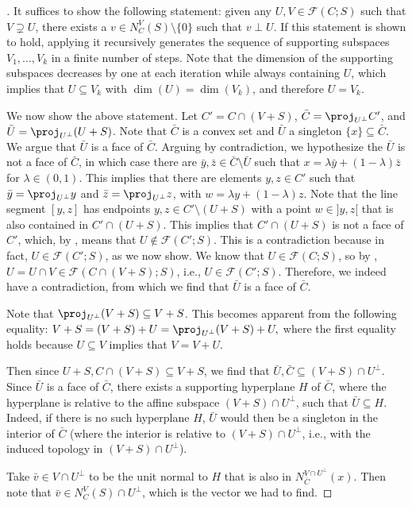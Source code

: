 \documentclass{article}
\theoremstyle{plain}
\theoremstyle{definition}
\theoremstyle{remark}
\begin{document}
\begin{proof}[\hypertarget{loc:completeness_of_the_composition_of_nested_normals.proof}Proof of \Cref{loc:completeness_of_the_composition_of_nested_normals.statement}]

It suffices to show the following statement: given any $U,V \in \mathcal{F}(C;S)$ such that $V \supsetneq U$,
there exists a $v \in N_C^V(S) \setminus \{0\}$ such that $v \perp U$. 
If this statement is shown to hold, applying it recursively generates the sequence of supporting subspaces $V_1, \ldots, V_k$ in a finite number of steps. 
Note that the dimension of the supporting subspaces decreases by one at each iteration while always containing $U$, which implies that $U \subseteq V_k$ with $\dim(U)=\dim(V_k)$, and therefore $U=V_k.$

We now show the above statement.
Let $C' = C \cap (V + S)$, $\bar{C} = \proj_{U^\perp} C'$, and $\bar{U} =  \proj_{U^\perp} (U + S)$.
Note that $\bar{C}$ is a convex set and $\bar{U}$
a singleton $\{x\} \subseteq \bar{C}$.  We argue that $\bar{U}$ is a face of $\bar{C}$.
Arguing by contradiction, we hypothesize the $\bar{U}$ is not a face of $\bar{C}$, in which case there are $\bar{y}, \bar{z} \in \bar{C}\setminus \bar{U}$
such that $x = \lambda\bar{y} + (1-\lambda)\bar{z}$ for $\lambda \in (0, 1)$. This implies that there are elements $y, z \in C'$ such that $\bar{y}= \proj_{U^\perp}y$ 
and $\bar{z}= \proj_{U^\perp}z$, with $w =  \lambda y+(1-\lambda)z$. Note that the line segment $[y,z]$ has endpoints $y, z \in C' \setminus (U+S)$ with a point $w  \in ]y,z[$  that is also contained in $C' \cap (U+S)$. This implies that $C' \cap (U+S)$ is not a face of $C'$, which, by , means that
$U \notin \mathcal{F}(C';S)$. This is a contradiction because in fact, $U  \in \mathcal{F}(C';S)$, as we now show. We know that $U  \in \mathcal{F}(C;S)$, so by
, $U = U \cap V \in \mathcal{F}(C \cap (V+ S);S)$, i.e., $U \in \mathcal{F}(C';S)$.
Therefore, we indeed have a contradiction, from which we find that $\bar{U}$ is a face of $\bar{C}$.

Note that $\proj_{U^\perp}(V + S) \subseteq V + S$. This becomes
apparent from the following equality:
$V + S = (V + S) + U = \proj_{U^\perp} (V + S) + U,$
where the first equality holds because $U \subseteq V$ implies that $V = V + U$. 

Then since $U+S, C \cap (V +S ) \subseteq V + S$, we find that $\bar{U}, \bar{C} \subseteq (V+S) \cap U^\perp$.
Since $\bar{U}$ is a face of $\bar{C}$, 
there exists a supporting hyperplane $H$ of $\bar{C}$, where
the hyperplane is relative to the affine subspace $(V+S) \cap U^\perp$, such that
$\bar{U} \subseteq H$.
Indeed, if there is no such hyperplane $H$, $\bar{U}$ would then be a singleton
in the interior of $\bar{C}$ (where the interior is relative to $(V+S)\cap U^\perp$, i.e., with the
induced topology in $(V+S)\cap U^\perp$).

Take $\bar{v} \in V \cap U^\perp$ to be the unit
normal to $H$ that is also in $N_{\bar{C}}^{V \cap U^\perp}(x)$. 
Then note that $\bar{v} \in N_C^{V}(S) \cap U^\perp$, which is the vector
we had to find.
\end{proof}
\end{document}
